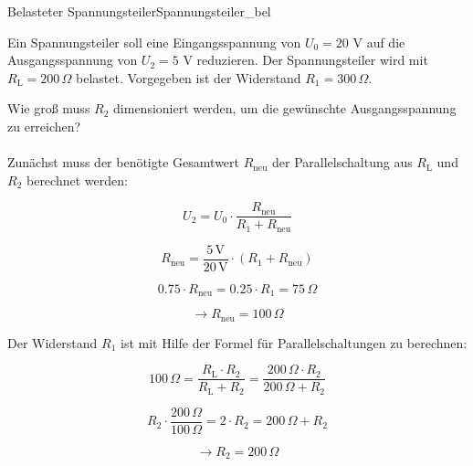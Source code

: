 \begin{frame}
{		\begin{bsp}{Belasteter Spannungsteiler}{Spannungsteiler_bel}

			Ein Spannungsteiler soll eine Eingangsspannung von $U_0 = 20$ V auf die Ausgangsspannung von $U_2 = 5$ V reduzieren.
			Der Spannungsteiler wird mit $R_\mathrm{L} = 200 \, \Omega$ belastet.
			Vorgegeben ist der Widerstand $R_1 = 300 \, \Omega$.

			Wie groß muss $R_2$ dimensioniert werden, um die gewünschte Ausgangsspannung zu erreichen?\\

			\phantom{.}\\


			Zunächst muss der benötigte Gesamtwert $R_\mathrm{neu}$ der Parallelschaltung aus $R_\mathrm{L}$ und $R_2$ berechnet werden:

			\begin{equation*}
				U_2 = U_0 \cdot \frac{R_\mathrm{neu}}{R_1+R_\mathrm{neu}}
			\end{equation*}

			\begin{equation*}
				R_\mathrm{neu} = \frac{5 \, \mathrm{V}}{20 \, \mathrm{V}} \cdot (R_1 + R_\mathrm{neu})
			\end{equation*}

			\begin{equation*}
				0.75 \cdot R_\mathrm{neu} = 0.25 \cdot R_1 = 75 \, \Omega
			\end{equation*}

			\begin{equation*}
				\rightarrow R_\mathrm{neu} = 100 \, \Omega
			\end{equation*}

			Der Widerstand $R_1$ ist mit Hilfe der Formel für Parallelschaltungen zu berechnen:

			\begin{equation*}
				100 \, \Omega = \frac{R_\mathrm{L} \cdot R_2}{R_\mathrm{L} + R_2} = \frac{200 \, \Omega \cdot R_2}{200 \, \Omega + R_2}
			\end{equation*}

			\begin{equation}
				R_2 \cdot \frac{200 \, \Omega}{100 \, \Omega} = 2 \cdot R_2 = 200 \, \Omega + R_2
			\end{equation}

			\begin{equation*}
				\rightarrow R_2 = 200 \, \Omega
			\end{equation*}




\end{bsp}}
\end{frame}
